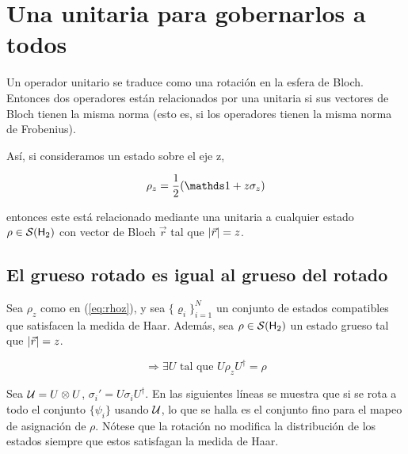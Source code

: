 \section{Una unitaria para gobernarlos a todos}

Un operador unitario se traduce como una rotación en la esfera de Bloch. Entonces dos operadores están relacionados por una unitaria si sus vectores de Bloch tienen la misma norma (esto es, si los operadores tienen la misma norma de Frobenius).

Así, si consideramos un estado sobre el eje z,

\begin{equation}\label{eq:rhoz}
\rho_{z}=\frac{1}{2}\qty(\Id+z\sigma_{z})
\end{equation}

entonces este está relacionado mediante una unitaria a cualquier estado $\rho\in\mathcal{S}({\sf H}_2)$ con vector de Bloch $\vec{r}$ tal que $\abs{\vec{r}}=z$.

\subsection{El grueso rotado es igual al grueso del rotado}
Sea $\rho_{z}$ como en (\ref{eq:rhoz}), y sea $\{\varrho_{i}\}_{i=1}^{N}$ un conjunto de estados compatibles que satisfacen la medida de Haar. Además, sea $\rho\in\mathcal{S}( {\sf H}_2)$ un estado grueso tal que $\abs{\vec{r}}=z$.

\begin{equation}
\Rightarrow \exists U \text{ tal que } U\rho_{z}U^{\dag}=\rho
\end{equation}

Sea $\mathcal{U}=U\otimes U$, $\sigma_{i}'=U\sigma_{i}U^{\dag}$. En las siguientes líneas se muestra que si se rota a todo el conjunto $\{\psi_{i}\}$ usando $\mathcal{U}$, lo que se halla es el conjunto fino para el mapeo de asignación de $\rho$. Nótese que la rotación no modifica la distribución de los estados siempre que estos satisfagan la medida de Haar.

